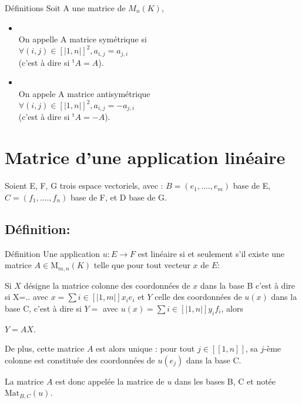 \documentclass{book}
\begin{document}
\begin{Définition}[]{Définitions}{}
Soit A une matrice de \(M_{n}(K)\),
\begin{itemize}
    \item \\ On appelle A matrice symétrique si 
\\ \(\forall (i,j) \in [|1,n|]^2, a_{i,j}=a_{j,i}\)
\\ (c'est à dire si \(^{\operatorname {t} }\!A=A\)).
\item \\ On appele A matrice antisymétrique 
\\ \(\forall (i,j) \in [|1,n|]^2, a_{i,j}=-a_{j,i}\)
\\ (c'est à dire si \(^{\operatorname {t} }\!A=-A\)).
\end{itemize}


\end{Définition}
\section{Matrice d'une application linéaire} 
Soient E, F, G trois espace vectoriels, avec :
$B=(e_{1},....,e_{m})$ base de E, 
$C=(f_{1},....,f_{n})$ base de F, 
et D base de G.
\subsection{Définition: }
\begin{Définition}[]{Définition}{}
Une application ${\displaystyle u:E\to F}$ est linéaire si et seulement s'il existe une matrice ${\displaystyle A\in \mathrm {M} _{m,n}(K)}$ telle que pour tout vecteur ${\displaystyle x}$ de ${\displaystyle E} $:

Si ${\displaystyle X}$ désigne la matrice colonne des coordonnées de ${\displaystyle x}$ dans la base B
c'est à dire si X=.. avec \(x=\sum i \in [|1,m|] x_{i}e_{i}\) et ${\displaystyle Y}$ celle des coordonnées de ${\displaystyle u(x)}$ dans la base C, c'est à dire si \(Y= \) avec \(u(x)=\sum i \in [|1,n|] y_{i}f_{i}\), alors
\begin{center}
    ${\displaystyle Y=AX}$.
\end{center}

De plus, cette matrice ${\displaystyle A}$ est alors unique : pour tout ${\displaystyle j\in [\![1,n]\!]}$, sa ${\displaystyle j}$-ème colonne est constituée des coordonnées de ${\displaystyle u(e_{j})}$ dans la base C.

La matrice ${\displaystyle A}$ est donc appelée la matrice de ${\displaystyle u}$ dans les bases B, C et notée ${\displaystyle \mathrm {Mat} _{B,C}(u)}$.
\end{Définition}
\end{document}
